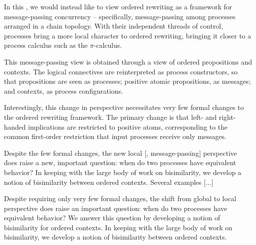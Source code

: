 In this , we would instead like to view ordered rewriting as a framework for message-passing concurrency -- specifically, message-passing among processes arranged in a chain topology.
With their independent threads of control, processes bring a more local character to ordered rewriting, bringing it closer to a process calculus such as the $\pi$-calculus.

This message-passing view is obtained through a \autocite{??} view of ordered propositions and contexts.
The logical connectives are reinterpreted as process constructors, so that propositions are seen as processes; positive atomic propositions, as messages; and contexts, as process configurations.




Interestingly, this change in perspective necessitates very few formal changes to the ordered rewriting framework.
The primary change is that left- and right-handed implications are restricted to positive atoms, corresponding to the common first-order restriction that input processes receive only messages.

Despite the few formal changes, the new local [, message-passing] perspective does raise a new, important question: when do two processes have equivalent behavior?
In keeping with the large body of work on bisimilarity\autocite{??}, we develop a notion of bisimilarity between ordered contexts.
Several examples [...]

Despite requiring only very few formal changes, the shift from global to local perspective does raise an important question: when do two processes have equivalent behavior?
We answer this question by developing a notion of bisimilarity for ordered contexts.
In keeping with the large body of work on bisimilarity\autocite{??}, we develop a notion of bisimilarity between ordered contexts.

